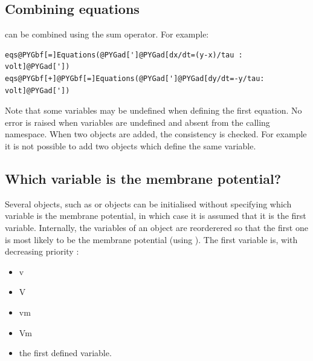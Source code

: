 \documentclass[letterpaper,10pt,english]{manual}
\begin{document}
\subsection{Combining equations}

\hyperlink{brian.Equations}{} can be combined using the sum operator. For example:

\begin{Verbatim}[commandchars=@\[\]]
eqs@PYGbf[=]Equations(@PYGad[']@PYGad[dx/dt=(y-x)/tau : volt]@PYGad['])
eqs@PYGbf[+]@PYGbf[=]Equations(@PYGad[']@PYGad[dy/dt=-y/tau: volt]@PYGad['])
\end{Verbatim}

Note that some variables may be undefined when defining the first equation. No error is
raised when variables are undefined and absent from the calling namespace.
When two \hyperlink{brian.Equations}{} objects are added, the consistency is checked. For example it is not
possible to add two \hyperlink{brian.Equations}{} objects which define the same variable.

\subsection{Which variable is the membrane potential?}

Several objects, such as \hyperlink{brian.Threshold}{} or \hyperlink{brian.Reset}{} objects
can be initialised without specifying which variable is the membrane potential, in which
case it is assumed that it is the first variable.
Internally, the variables of an \hyperlink{brian.Equations}{} object are reorderered so that the first one
is most likely to be the membrane potential (using ).
The first variable is, with decreasing priority :
\begin{itemize}
\item {} 
v

\item {} 
V

\item {} 
vm

\item {} 
Vm

\item {} 
the first defined variable.

\end{itemize}
\hypertarget{numerical-integration}{}
\end{document}
